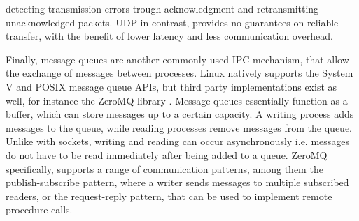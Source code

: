 detecting transmission errors trough acknowledgment and retransmitting unacknowledged packets. \ac{UDP} in contrast, provides no guarantees on reliable transfer, with the benefit of lower latency and less communication overhead. \cite[p.29ff.]{stevens1998sock}
\par
{}
Finally, message queues are another commonly used \ac{IPC} mechanism, that allow the exchange of messages between processes. Linux natively supports the System V and POSIX message queue APIs, but third party
implementations exist as well, for instance the ZeroMQ library \cite{sysystemvshm,mposixmsqzeromq}. Message queues essentially function as a buffer, which can store messages up to a certain capacity. A writing process adds messages to the queue, while
reading processes remove messages from the queue. Unlike with sockets, writing and reading can occur asynchronously i.e. messages do not have to be read immediately after being added to a queue. ZeroMQ specifically, supports a range of communication 
patterns, among them the publish-subscribe pattern, where a writer sends messages to multiple subscribed readers, or the request-reply pattern, that can be used to implement remote procedure calls.         

